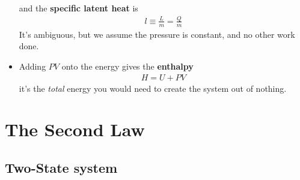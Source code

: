 \documentclass{book}
\begin{document}
\begin{itemize}
        and the \textbf{specific latent heat} is
        \begin{align}
          \label{eq:specific latent}
          l \equiv \frac{L}{m}= \frac{Q}{m}
        \end{align}
        It's ambiguous, but we assume the pressure is constant, and no other work done.
  \item Adding $PV$ onto the energy gives the \textbf{enthalpy}
        \begin{align}
          \label{eq:enthalpy}
          H = U + PV
        \end{align}
        it's the \textit{total} energy you would need to create the system out of nothing.



\end{itemize}


\chapter{The Second Law}

\section{Two-State system}%
\label{sec:two state}
\end{document}
